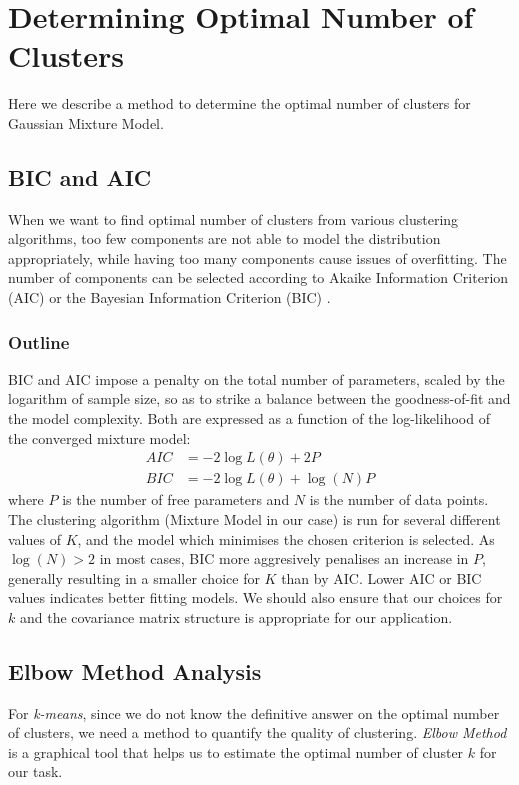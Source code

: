 \section{Determining Optimal Number of Clusters} \label{2.2}
Here we describe a method to determine the optimal number of clusters for Gaussian Mixture Model.
\subsection{BIC and AIC} \label{2.2.1}
When we want to find optimal number of clusters from various clustering algorithms, too few components are not able to model the distribution appropriately, while having too many components cause issues of overfitting. The number of components can be selected according to Akaike Information Criterion (AIC) \cite{Akaike1998} or the Bayesian Information Criterion (BIC) \cite{Schwarz1978}. 
\subsubsection{Outline}
BIC and AIC impose a penalty on the total number of parameters, scaled by the logarithm of sample size, so as to strike a balance between the goodness-of-fit and the model complexity.
Both are expressed as a function of the log-likelihood of the converged mixture model:
\begin{align*}
AIC  &= -2\log L(\theta) + 2P\\
BIC &= -2\log L(\theta) + \log(N)P
\end{align*}
where $P$ is the number of free parameters and $N$ is the number of data points. The clustering algorithm (Mixture Model in our case) is run for several different values of $K$, and the model which minimises the chosen criterion is selected. As $\log(N)>2$ in most cases, BIC more aggresively penalises an increase in $P$, generally resulting in a smaller choice for $K$ than by AIC. Lower AIC or BIC values indicates better fitting models. We should also ensure that our choices for $k$ and the covariance matrix structure is appropriate for our application. 

\subsection{Elbow Method Analysis} \label{2.2.2}
For \textit{k-means}, since we do not know the definitive answer on the optimal number of clusters, we need a method to quantify the quality of clustering. \textit{Elbow Method} is a graphical tool that helps us to estimate the optimal number of cluster $k$ for our task. 
